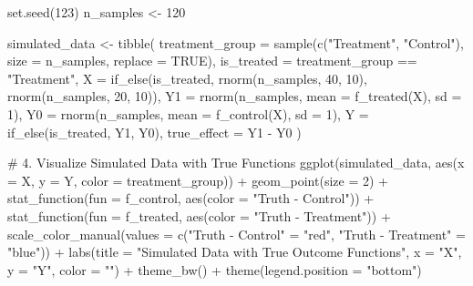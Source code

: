 \documentclass[
  letterpaper,
  DIV=11,
  numbers=noendperiod]{scrreprt}
\newenvironment{Shaded}{\begin{snugshade}}{\end{snugshade}}
\newcommand{\AttributeTok}[1]{\textcolor[rgb]{0.40,0.45,0.13}{#1}}
\newcommand{\CommentTok}[1]{\textcolor[rgb]{0.37,0.37,0.37}{#1}}
\newcommand{\ConstantTok}[1]{\textcolor[rgb]{0.56,0.35,0.01}{#1}}
\newcommand{\DecValTok}[1]{\textcolor[rgb]{0.68,0.00,0.00}{#1}}
\newcommand{\FunctionTok}[1]{\textcolor[rgb]{0.28,0.35,0.67}{#1}}
\newcommand{\NormalTok}[1]{\textcolor[rgb]{0.00,0.23,0.31}{#1}}
\newcommand{\OtherTok}[1]{\textcolor[rgb]{0.00,0.23,0.31}{#1}}
\newcommand{\SpecialCharTok}[1]{\textcolor[rgb]{0.37,0.37,0.37}{#1}}
\newcommand{\StringTok}[1]{\textcolor[rgb]{0.13,0.47,0.30}{#1}}
\begin{document}
\begin{Shaded}
\begin{Highlighting}[]
\FunctionTok{set.seed}\NormalTok{(}\DecValTok{123}\NormalTok{)}
\NormalTok{n\_samples }\OtherTok{\textless{}{-}} \DecValTok{120}

\NormalTok{simulated\_data }\OtherTok{\textless{}{-}} \FunctionTok{tibble}\NormalTok{(}
  \AttributeTok{treatment\_group =} \FunctionTok{sample}\NormalTok{(}\FunctionTok{c}\NormalTok{(}\StringTok{"Treatment"}\NormalTok{, }\StringTok{"Control"}\NormalTok{), }\AttributeTok{size =}\NormalTok{ n\_samples, }\AttributeTok{replace =} \ConstantTok{TRUE}\NormalTok{),}
  \AttributeTok{is\_treated =}\NormalTok{ treatment\_group }\SpecialCharTok{==} \StringTok{"Treatment"}\NormalTok{,}
  \AttributeTok{X =} \FunctionTok{if\_else}\NormalTok{(is\_treated, }\FunctionTok{rnorm}\NormalTok{(n\_samples, }\DecValTok{40}\NormalTok{, }\DecValTok{10}\NormalTok{), }\FunctionTok{rnorm}\NormalTok{(n\_samples, }\DecValTok{20}\NormalTok{, }\DecValTok{10}\NormalTok{)),}
  \AttributeTok{Y1 =} \FunctionTok{rnorm}\NormalTok{(n\_samples, }\AttributeTok{mean =} \FunctionTok{f\_treated}\NormalTok{(X), }\AttributeTok{sd =} \DecValTok{1}\NormalTok{),  }
  \AttributeTok{Y0 =} \FunctionTok{rnorm}\NormalTok{(n\_samples, }\AttributeTok{mean =} \FunctionTok{f\_control}\NormalTok{(X), }\AttributeTok{sd =} \DecValTok{1}\NormalTok{),  }
  \AttributeTok{Y =} \FunctionTok{if\_else}\NormalTok{(is\_treated, Y1, Y0),}
  \AttributeTok{true\_effect =}\NormalTok{ Y1 }\SpecialCharTok{{-}}\NormalTok{ Y0}
\NormalTok{)}


\CommentTok{\# 4. Visualize Simulated Data with True Functions}
\FunctionTok{ggplot}\NormalTok{(simulated\_data, }\FunctionTok{aes}\NormalTok{(}\AttributeTok{x =}\NormalTok{ X, }\AttributeTok{y =}\NormalTok{ Y, }\AttributeTok{color =}\NormalTok{ treatment\_group)) }\SpecialCharTok{+}
  \FunctionTok{geom\_point}\NormalTok{(}\AttributeTok{size =} \DecValTok{2}\NormalTok{) }\SpecialCharTok{+} 
  \FunctionTok{stat\_function}\NormalTok{(}\AttributeTok{fun =}\NormalTok{ f\_control, }\FunctionTok{aes}\NormalTok{(}\AttributeTok{color =} \StringTok{"Truth {-} Control"}\NormalTok{)) }\SpecialCharTok{+}
  \FunctionTok{stat\_function}\NormalTok{(}\AttributeTok{fun =}\NormalTok{ f\_treated, }\FunctionTok{aes}\NormalTok{(}\AttributeTok{color =} \StringTok{"Truth {-} Treatment"}\NormalTok{)) }\SpecialCharTok{+}
  \FunctionTok{scale\_color\_manual}\NormalTok{(}\AttributeTok{values =} \FunctionTok{c}\NormalTok{(}\StringTok{"Truth {-} Control"} \OtherTok{=} \StringTok{"red"}\NormalTok{, }\StringTok{"Truth {-} Treatment"} \OtherTok{=} \StringTok{"blue"}\NormalTok{)) }\SpecialCharTok{+} 
  \FunctionTok{labs}\NormalTok{(}\AttributeTok{title =} \StringTok{"Simulated Data with True Outcome Functions"}\NormalTok{, }
       \AttributeTok{x =} \StringTok{"X"}\NormalTok{, }\AttributeTok{y =} \StringTok{"Y"}\NormalTok{, }\AttributeTok{color =} \StringTok{""}\NormalTok{) }\SpecialCharTok{+}
  \FunctionTok{theme\_bw}\NormalTok{() }\SpecialCharTok{+}
  \FunctionTok{theme}\NormalTok{(}\AttributeTok{legend.position =} \StringTok{"bottom"}\NormalTok{) }
\end{Highlighting}
\end{Shaded}
\end{document}
